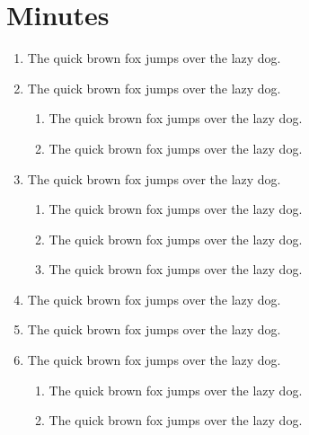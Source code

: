\documentclass[12pt]{article}
\begin{document}
\section*{Minutes}
\begin{enumerate}
    \item The quick brown fox jumps over the lazy dog.
    \item The quick brown fox jumps over the lazy dog.
    \begin{enumerate}
        \item The quick brown fox jumps over the lazy dog.
        \item The quick brown fox jumps over the lazy dog.
    \end{enumerate}
    \item The quick brown fox jumps over the lazy dog.
    \begin{enumerate}
        \item The quick brown fox jumps over the lazy dog.
        \item The quick brown fox jumps over the lazy dog.
        \item The quick brown fox jumps over the lazy dog.
    \end{enumerate}
    \item The quick brown fox jumps over the lazy dog.
    \item The quick brown fox jumps over the lazy dog.
    \item The quick brown fox jumps over the lazy dog.
    \begin{enumerate}
        \item The quick brown fox jumps over the lazy dog.
        \item The quick brown fox jumps over the lazy dog.
    \end{enumerate}
\end{enumerate}
\end{document}
